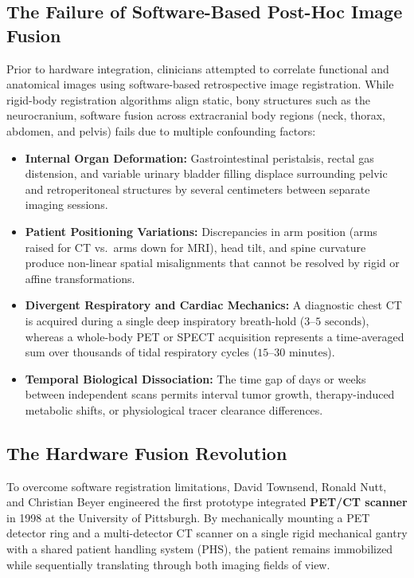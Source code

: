 \documentclass[11pt,a4paper]{article}
\begin{document}
\subsection{The Failure of Software-Based Post-Hoc Image Fusion}
Prior to hardware integration, clinicians attempted to correlate functional and anatomical images using software-based retrospective image registration. While rigid-body registration algorithms align static, bony structures such as the neurocranium, software fusion across extracranial body regions (neck, thorax, abdomen, and pelvis) fails due to multiple confounding factors:
\begin{itemize}[leftmargin=2em]
    \item \textbf{Internal Organ Deformation:} Gastrointestinal peristalsis, rectal gas distension, and variable urinary bladder filling displace surrounding pelvic and retroperitoneal structures by several centimeters between separate imaging sessions.
    \item \textbf{Patient Positioning Variations:} Discrepancies in arm position (arms raised for CT vs.\ arms down for MRI), head tilt, and spine curvature produce non-linear spatial misalignments that cannot be resolved by rigid or affine transformations.
    \item \textbf{Divergent Respiratory and Cardiac Mechanics:} A diagnostic chest CT is acquired during a single deep inspiratory breath-hold ($3\text{--}5\text{ seconds}$), whereas a whole-body PET or SPECT acquisition represents a time-averaged sum over thousands of tidal respiratory cycles ($15\text{--}30\text{ minutes}$).
    \item \textbf{Temporal Biological Dissociation:} The time gap of days or weeks between independent scans permits interval tumor growth, therapy-induced metabolic shifts, or physiological tracer clearance differences.
\end{itemize}

\subsection{The Hardware Fusion Revolution}
To overcome software registration limitations, David Townsend, Ronald Nutt, and Christian Beyer engineered the first prototype integrated \textbf{PET/CT scanner} in 1998 at the University of Pittsburgh. By mechanically mounting a PET detector ring and a multi-detector CT scanner on a single rigid mechanical gantry with a shared patient handling system (PHS), the patient remains immobilized while sequentially translating through both imaging fields of view.
\end{document}
